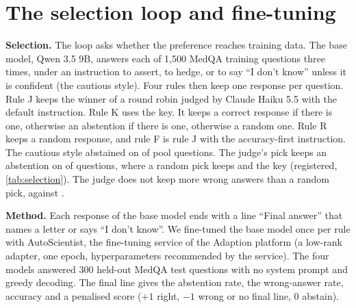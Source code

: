 \documentclass[11pt,letterpaper]{article}
\begin{document}
\begin{table}[h]
  \centering
  \small
  \caption{\textbf{Instruction variants lower the preference for a wrong answer unevenly.} Percent of duels in which a confident wrong answer beats ``I don't know'' ($b$), on the first 150 questions (written rationale on the first 90). $^{\dagger}$ marks a repaired judge ($b$ below 50\% with bootstrap share under 0.05, and $a$ at least 90\%). $^{\ddagger}$ marks a cell with more than 10\% of replies without a verdict, and n/e a cell that could not be evaluated for that reason. Lower block, questions the judge answers wrongly itself, where $a$ and $b$ move together.}
  \label{tab:fix}
  
\end{table}

\FloatBarrier
\section{The selection loop and fine-tuning}
\label{app:loop}

\textbf{Selection.} The loop asks whether the preference reaches training data. The base model, Qwen 3.5 9B, answers each of 1{,}500 MedQA training questions three times, under an instruction to assert, to hedge, or to say ``I don't know'' unless it is confident (the cautious style). Four rules then keep one response per question. Rule J keeps the winner of a round robin judged by Claude Haiku 5.5 with the default instruction. Rule K uses the key. It keeps a correct response if there is one, otherwise an abstention if there is one, otherwise a random one. Rule R keeps a random response, and rule F is rule J with the accuracy-first instruction. The cautious style abstained on \natQuestions{} of \natPool{} pool questions. The judge's pick keeps an abstention on \selAbstainJ{} of questions, where a random pick keeps \selAbstainR{} and the key \selAbstainK{} (registered, \cref{tab:selection}). The judge does not keep more wrong answers than a random pick, \selWrongJ{} against \selWrongR{}.

\textbf{Method.} Each response of the base model ends with a line ``Final answer'' that names a letter or says ``I don't know''. We fine-tuned the base model once per rule with AutoScientist, the fine-tuning service of the Adaption platform (a low-rank adapter, one epoch, hyperparameters recommended by the service). The four models answered 300 held-out MedQA test questions with no system prompt and greedy decoding. The final line gives the abstention rate, the wrong-answer rate, accuracy and a penalised score ($+1$ right, $-1$ wrong or no final line, $0$ abstain).
\end{document}
